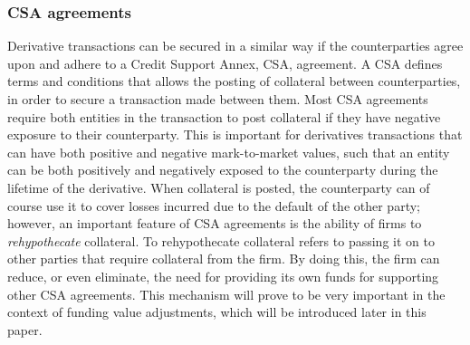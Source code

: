 \documentclass[main.tex]{subfiles}
\begin{document}
        \subsubsection{CSA agreements}
        Derivative transactions can be secured in a similar way 
        if the counterparties agree upon and adhere to a Credit Support Annex, CSA, agreement.
        A CSA defines terms and conditions that allows the posting of collateral between counterparties, 
        in order to secure a transaction made between them.
        Most CSA agreements require both entities in the transaction to post collateral 
        if they have negative exposure to their counterparty. 
        This is important for derivatives transactions that can have both 
        positive and negative mark-to-market values, 
        such that an entity can be both positively and negatively exposed to the counterparty
        during the lifetime of the derivative.
        When collateral is posted, the counterparty can of course use it to cover losses incurred 
        due to the default of the other party;
        however, an important feature of CSA agreements is the ability of firms to
        \textit{rehypothecate} collateral.
        To rehypothecate collateral refers to passing it on to other parties that
        require collateral from the firm.
        By doing this, the firm can reduce, or even eliminate, the need for providing its own funds
        for supporting other CSA agreements. 
        This mechanism will prove to be very important in the context of funding value adjustments,
        which will be introduced later in this paper.
\end{document}
